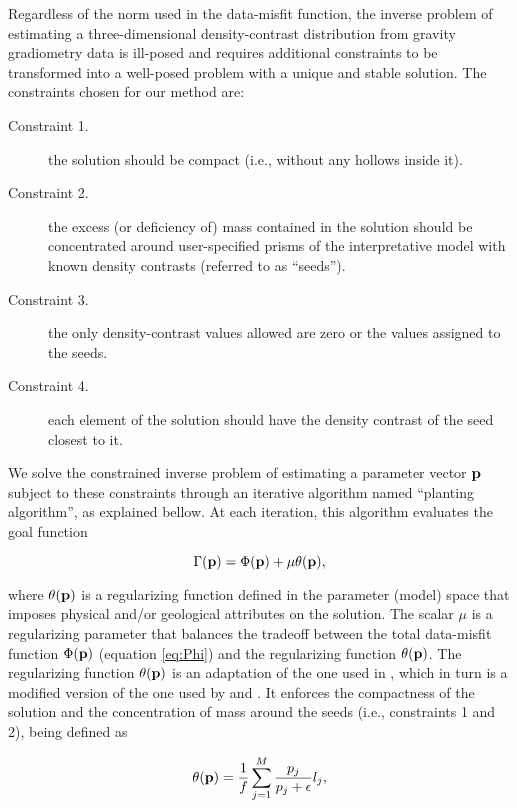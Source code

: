\indent
Regardless of the norm used in the data-misfit function,
the inverse problem of
estimating a three-dimensional density-contrast distribution from
gravity gradiometry data is ill-posed and requires additional constraints to be
transformed into a well-posed problem with a unique and stable solution.
The constraints chosen for our method are:

\begin{description}
\item[Constraint 1.] the solution should be compact (i.e., without
    any hollows inside it). 
\item[Constraint 2.] the excess (or deficiency of) mass contained
    in the solution should be concentrated around user-specified prisms of the
    interpretative model with known density contrasts (referred to as
    ``seeds'').
\item[Constraint 3.] the only density-contrast values allowed are
    zero or the values assigned to the seeds.
\item[Constraint 4.] each element of the solution should have the
    density contrast of the seed closest to it.
\end{description}

\noindent We solve the constrained inverse problem of estimating a
parameter vector $\mathbf{p}$ subject to these constraints through an iterative
algorithm named ``planting algorithm'', as explained bellow.
At each iteration, this algorithm evaluates the goal function

\begin{equation}
\Gamma(\mathbf{p}) = \Phi(\mathbf{p}) + \mu\theta(\mathbf{p}),
\label{eq:goal}
\end{equation}

\noindent
where $\theta(\mathbf{p})$ is a regularizing function defined in the parameter
(model) space that imposes physical and/or geological attributes on the
solution.
The scalar $\mu$ is a regularizing parameter that balances the tradeoff between
the total data-misfit
function $\Phi(\mathbf{p})$ (equation \ref{eq:Phi}) and the regularizing
function $\theta(\mathbf{p})$.
The regularizing function $\theta(\mathbf{p})$ is an adaptation of the one used in
\citet{silvadias09}, which in turn is a modified version of the one used by
\citet{guillen_menichetti} and \citet{silva_barbosa06}.
It enforces the compactness of the solution and the concentration of mass around
the seeds (i.e., constraints 1 and 2), being defined as

\begin{equation}
\theta(\mathbf{p}) = \frac{1}{f} \sum\limits_{j=1}^{M} \frac{p_j}{p_j + \epsilon}
    l_j,
\label{eq:regul}
\end{equation}

